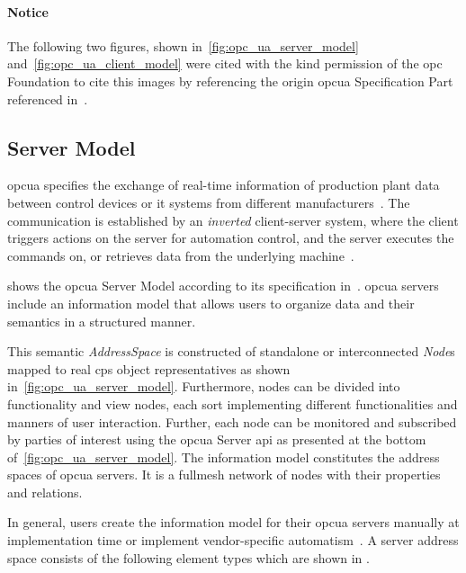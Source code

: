 \documentclass[
a4paper,
twoside,
headsepline,
cleardoublepage=empty,
parskip=half,
draft=false
]{scrbook}
\begin{document}
			\paragraph{Notice} The following two figures, shown in~\cref{fig:opc_ua_server_model} and~\cref{fig:opc_ua_client_model} were cited with the kind permission of the \gls{opc} Foundation to cite this images by referencing the origin \gls{opcua} Specification Part referenced in~\cite{opcfoundation2017part1}.

			\subsection{Server Model}\label{subsec:opc_ua_server_model}

				\gls{opcua} specifies the exchange of real-time information of production plant data between control devices or \gls{it} systems from different manufacturers~\cite{venkatesh2005validating}.
				The communication is established by an \textit{inverted} client-server system, where the client triggers actions on the server for automation control, and the server executes the commands on, or retrieves data from the underlying machine~\cite{imtiaz2013scalability}.
				
				 shows the \gls{opcua} Server Model according to its specification in~\cite{opcfoundation2017part1}.
				\gls{opcua} servers include an information model that allows users to organize data and their semantics in a structured manner.
				
				This semantic \textit{AddressSpace} is constructed of standalone or interconnected \textit{Node}s mapped to real \gls{cps} object representatives as shown in~\cref{fig:opc_ua_server_model}.
				Furthermore, nodes can be divided into functionality and view nodes, each sort implementing different functionalities and manners of user interaction. Further, each node can be monitored and subscribed by parties of interest using the \gls{opcua} Server \gls{api} as presented at the bottom of~\cref{fig:opc_ua_server_model}.
				The information model constitutes the address spaces of \gls{opcua} servers.
				It is a fullmesh network of nodes with their properties and relations.
				
				In general, users create the information model for their \gls{opcua} servers manually at implementation time or implement vendor-specific automatism~\cite{henssen2014online}.
				A server address space consists of the following element types which are shown in .
\end{document}
